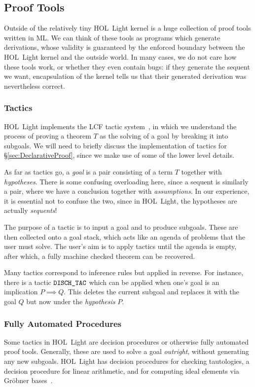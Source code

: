 \subsection{Proof Tools}
Outside of the relatively tiny HOL~Light kernel is a huge collection of proof tools written in ML. We can think of these tools as programs which generate derivations, whose validity is guaranteed by the enforced boundary between the HOL~Light kernel and the outside world. In many cases, we do not care how these tools work, or whether they even contain bugs: if they generate the sequent we want, encapsulation of the kernel tells us that their generated derivation was nevertheless correct.

\subsubsection{Tactics}
HOL~Light implements the LCF tactic system~\cite{Tactics}, in which we understand the process of proving a theorem $T$ as the solving of a goal by breaking it into subgoals. We will need to briefly discuss the implementation of tactics for \S\ref{sec:DeclarativeProof}, since we make use of some of the lower level details.

As far as tactics go, a \emph{goal} is a pair consisting of a term $T$ together with \emph{hypotheses}. There is some confusing overloading here, since a sequent is similarly a pair, where we have a conclusion together with \emph{assumptions}. In our experience, it is essential not to confuse the two, since in HOL~Light, the hypotheses are actually \emph{sequents}!

The purpose of a tactic is to input a goal and to produce subgoals. These are then collected onto a goal stack, which acts like an agenda of problems that the user must solve. The user's aim is to apply tactics until the agenda is empty, after which, a fully machine checked theorem can be recovered.

Many tactics correspond to inference rules but applied in reverse. For instance, there is a tactic $\texttt{DISCH\_TAC}$ which can be applied when one's goal is an implication $P \implies Q$. This deletes the current subgoal and replaces it with the goal $Q$ but now under the \emph{hypothesis} $P$.

\subsubsection{Fully Automated Procedures}
Some tactics in HOL~Light are decision procedures or otherwise fully automated proof tools. Generally, these are used to solve a goal \emph{outright}, without generating any new subgoals. HOL~Light has decision procedures for checking tautologies, a decision procedure for linear arithmetic, and for computing ideal elements via Gr\"{o}bner bases~\cite{BuchbergerGrobner}. 

